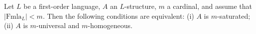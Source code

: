 Let $L$ be a first-order language, $A$ an $L$-structure, $m$ a cardinal, and assume that $|\text{Fmla}_L| < m$. Then the following conditions are equivalent:
(i) $A$ is $m$-saturated;
(ii) $A$ is $m$-universal and $m$-homogeneous.

